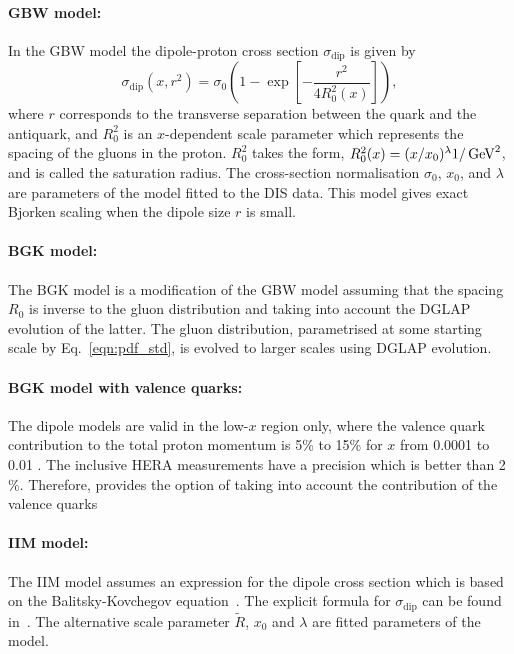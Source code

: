 \paragraph{GBW model:} \rm
In the GBW model the dipole-proton cross section $\sigma_{\text{dip}}$ is given by
\begin{equation}
\label{eGBW}
   \sigma_{\text{dip}}(x,r^{2}) = \sigma_{0} \left(1 - \exp \left[-\frac{r^{2}}{4R_{0}^{2}(x)} \right]\right),
\end{equation}
where $r$ corresponds to the transverse separation between the quark and the antiquark, and $R_{0}^{2}$
 is an $x$-dependent scale parameter which represents the spacing of the gluons in the proton. 
$R_{0}^{2}$ takes the form, $R_0^2(x) = (x/x_0)^\lambda  1/ {\rm \,\text{Ge\hspace{-.08em}V}}^{2}$, and is called the saturation radius.
The cross-section normalisation $\sigma_0$, $x_0$, and $\lambda$ are parameters 
of the model fitted to the DIS data.
This model gives exact Bjorken scaling when the dipole size $r$ is small.
 
\paragraph{BGK model:} \rm
The BGK model is a modification of the GBW model assuming that the
spacing $R_0$ is inverse to the gluon distribution and taking
into account the DGLAP evolution of the latter.
The gluon distribution, parametrised at some starting scale by Eq.~\ref{eqn:pdf_std}, 
is evolved to larger scales using DGLAP evolution.

\paragraph{BGK model with valence quarks:} \rm
The dipole models are valid in the low-$x$ region only, where the valence quark contribution to the total proton momentum 
is 5\% to 15\% for $x$ from 0.0001 to 0.01 \cite{Collaboration:2010ry}.
The inclusive HERA measurements have a precision which is better than 2$\%$. 
Therefore, \fitter provides the option of taking into account the contribution of the valence quarks
%

\paragraph{IIM model:} \rm
The IIM model assumes an expression for the dipole cross section which is based on the 
Balitsky-Kovchegov equation~\cite{Balitsky:1995ub}. The explicit formula for $\sigma_{\text{dip}}$ 
can be found in~\cite{Iancu:2003ge}. 
The alternative scale parameter $\tilde{R}$, $x_{0}$ and $\lambda$ are fitted parameters of the model.

